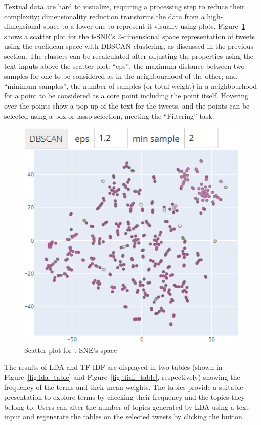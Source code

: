 Textual data are hard to visualize, requiring a processing step to reduce their complexity;
dimensionality reduction transforms the data from a high-dimensional space to a lower one to
represent it visually using plots. Figure~\ref{fig:scatter} shows a scatter plot for the
\ac{t-SNE}'s 2-dimensional space representation of tweets using the euclidean space with \ac{DBSCAN}
clustering, as discussed in the previous section. The clusters can be recalculated after adjusting
the properties using the text inputs above the scatter plot: ``eps'', the maximum distance between
two samples for one to be considered as in the neighbourhood of the other; and ``minimum samples'',
the number of samples (or total weight) in a neighbourhood for a point to be considered as a core
point including the point itself. Hovering over the points show a pop-up of the text for the tweets,
and the points can be selected using a box or lasso selection, meeting the ``Filtering'' task.

\begin{figure}[H]
\begin{center}
  \includegraphics[width=0.5\columnwidth]{./images/scatter.png}
\end{center}
\caption{Scatter plot for t-SNE's space}
\label{fig:scatter}
\end{figure}

The results of \ac{LDA} and \ac{TF-IDF} are displayed in two tables (shown in
Figure~\ref{fig:lda_table} and Figure~\ref{fig:tfidf_table}, respectively)  showing the frequency of
the terms and their mean weights. The tables provide a suitable presentation to explore terms by
checking their frequency and the topics they belong to. Users can alter the number of topics
generated by \ac{LDA} using a text input and regenerate the tables on the selected tweets by
clicking the button. 

